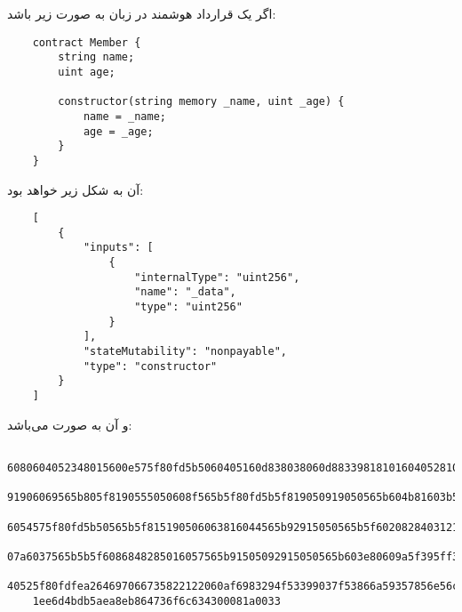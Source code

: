\documentclass[10pt, a4paper]{article}
\begin{document}
اگر یک قرارداد هوشمند در زبان  به صورت زیر باشد:

\begin{LTR}
    \begin{lstlisting}
    contract Member {
        string name;
        uint age;

        constructor(string memory _name, uint _age) {
            name = _name;
            age = _age;
        }
    }
    \end{lstlisting}
\end{LTR}

 آن به شکل زیر خواهد بود:

\begin{LTR}
    \begin{lstlisting}
    [
        {
            "inputs": [
                {
                    "internalType": "uint256",
                    "name": "_data",
                    "type": "uint256"
                }
            ],
            "stateMutability": "nonpayable",
            "type": "constructor"
        }
    ]
    \end{lstlisting}
\end{LTR}

و  آن به صورت می‌باشد:

\begin{LTR}
    \begin{lstlisting}
    6080604052348015600e575f80fd5b5060405160d838038060d88339818101604052810190602c
    91906069565b805f8190555050608f565b5f80fd5b5f819050919050565b604b81603b565b8114
    6054575f80fd5b50565b5f815190506063816044565b92915050565b5f60208284031215607b576
    07a6037565b5b5f6086848285016057565b91505092915050565b603e80609a5f395ff3fe608060
    40525f80fdfea264697066735822122060af6983294f53399037f53866a59357856e56c6f167c92
    1ee6d4bdb5aea8eb864736f6c634300081a0033
    \end{lstlisting}
\end{LTR}
\end{document}
